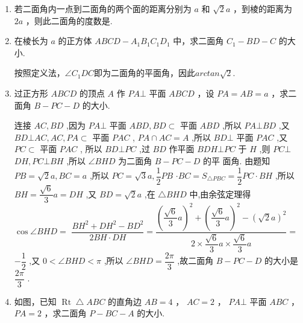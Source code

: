 \begin{enumerate}
\item 若二面角内一点到二面角的两个面的距离分别为 $ a $ 和 $ \sqrt{2}a $ ，到棱的距离为 $ {2a} $ ，则此二面角的度数是.



\item 在棱长为 $a$ 的正方体 $ {{ABCD}} - {{A}}_{1}{{B}}_{1}{{C}}_{1}{{D}}_{1} $ 中，求二面角 $ {{C}}_{1} - {{BD}} - {C} $ 的大小.

\begin{jieda}
    按照定义法，$\angle{C_1DC}$即为二面角的平面角，因此$arctan\sqrt{2}$.
\end{jieda}

\item 过正方形 $ {ABCD} $ 的顶点 $ A $ 作 $ {PA} \bot $ 平面 $ {ABCD} $ ，设 $ {PA} = {AB} = a $ ，求二面角 $ B - PC-D$ 的大小.

\begin{jieda}
    连接 $ {AC},{BD} $ ,因为 $ {PA} \bot $ 平面 $ {ABD},{BD} \subset $ 平面
$ {ABD} $ ,所以 $ {PA} \bot  {BD} $ ,又 $ {BD} \bot  {AC},{AC},{PA} \subset $ 平面 $ {PAC} $ ,
$ {PA} \cap  {AC} = A $ ,所以 $ {BD}\bot $ 平面 $ {PAC} $ ,又 $ {PC} \subset $ 平面 $ {PAC} $ ,
所以 $ {BD} \bot  {PC} $ ,过 $ {BD} $ 作平面 $ {BDH} \bot  {PC} $ 于 $ H $ ,则 $ {PC} \bot $
$ {DH},{PC} \bot  {BH} $ ,所以 $ \angle {BHD} $ 为二面角 $ B - {PC} - D $ 的平
面角. 由题知 $ {PB} = \sqrt{2}a,{BC} = a $ ,所以 $ {PC} = \sqrt{3}a,\dfrac{1}{2}{PB} $
$ \cdot  {BC} = {S}_{\bigtriangleup {PBC}} = \dfrac{1}{2}{PC} \cdot  {BH} $ ,所以 $ {BH} = \dfrac{\sqrt{6}}{3}a = {DH} $ ,又
$ {BD} = \sqrt{2}a $ ,在 $ \bigtriangleup {BHD} $ 中,由余弦定理得 $ \cos \angle {BHD} = $
$ \dfrac{B{H}^{2} + D{H}^{2} - B{D}^{2}}{{2BH} \cdot  {DH}} = \dfrac{{\left( \dfrac{\sqrt{6}}{3}a\right) }^{2} + {\left( \dfrac{\sqrt{6}}{3}a\right) }^{2} - {\left( \sqrt{2}a\right) }^{2}}{2 \times  \dfrac{\sqrt{6}}{3}a \times  \dfrac{\sqrt{6}}{3}a} = $
$ - \dfrac{1}{2} $ ,又 $ 0 < \angle {BHD} < \pi $ ,所以 $ \angle {BHD} = \dfrac{2\pi }{3} $ ,故二面角
$ B - {PC} - D $ 的大小是 $ \dfrac{2\pi }{3} $ .

\end{jieda}



\item 如图，已知 $ \operatorname{Rt} \bigtriangleup  {ABC} $ 的直角边 $ {AB} = 4 $ ， $ {AC} = 2 $ ， $ {PA}\bot $ 平面 $ {ABC} $ ， $ {PA} = 2 $ ，求二面角 $ P - {BC} - A $ 的大小.

\begin{center}


\end{center}
\end{enumerate}
